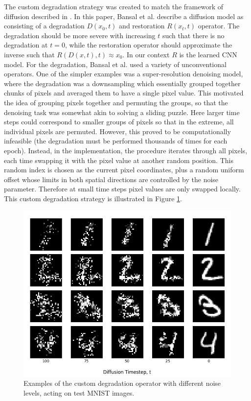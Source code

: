 \documentclass[12pt]{article}
\begin{document}
The custom degradation strategy was created to match the framework of diffusion described in \cite{bansal2022cold}.
In this paper, Bansal et al. describe a diffusion model as consisting of a degradation $D(x_0,t)$ and restoration $R(x_t, t)$ operator.
The degradation should be more severe with increasing $t$ such that there is no degradation at $t=0$,
while the restoration operator should approximate the inverse such that $R(D(x,t),t) \approx x_0$.
In our context $R$ is the learned CNN model.
For the degradation, Bansal et al. used a variety of unconventional operators.
One of the simpler examples was a super-resolution denoising model,
where the degradation was a downsampling which essentially grouped together chunks of pixels and averaged them to have a single pixel value.
This motivated the idea of grouping pixels together and permuting the groups,
so that the denoising task was somewhat akin to solving a sliding puzzle.
Here larger time steps could correspond to smaller groups of pixels so that in the extreme, all individual pixels are permuted.
However, this proved to be computationally infeasible (the degradation must be performed thousands of times for each epoch).
Instead, in the implementation, the procedure iterates through all pixels, each time swapping it with the pixel value at another random position.
This random index is chosen as the current pixel coordinates, plus a random uniform offset whose limits in both spatial directions are controlled by the noise parameter.
Therefore at small time steps pixel values are only swapped locally.
This custom degradation strategy is illustrated in Figure \ref{fig:custom}.

\begin{figure}[hp]
    \includegraphics[scale=0.7, center]{figures/custom_degradation.png}
    \caption{Examples of the custom degradation operator with different noise levels, acting on test MNIST images.}
    \label{fig:custom}
\end{figure}
\end{document}
